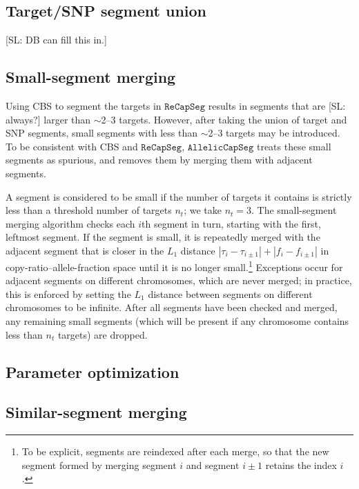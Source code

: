 \documentclass[nofootinbib,amssymb,amsmath]{revtex4}
\newcommand{\RCS}{\texttt{ReCapSeg}}
\newcommand{\ACS}{\texttt{AllelicCapSeg}}
\def\SL#1{{\color [rgb]{0,0,0.8} [SL: #1]}}
\begin{document}
\subsection{Target/SNP segment union} \label{targetsnp-segment-union}

\SL{DB can fill this in.}

\subsection{Small-segment merging} \label{small-segment-merging}

Using CBS to segment the targets in $\RCS$ results in segments that are \SL{always?} larger than $\sim$2--3 targets.  However, after taking the union of target and SNP segments, small segments with less than $\sim$2--3 targets may be introduced.  To be consistent with CBS and $\RCS$, $\ACS$ treats these small segments as spurious, and removes them by merging them with adjacent segments.

A segment is considered to be small if the number of targets it contains is strictly less than a threshold number of targets $n_t$; we take $n_t = 3$.  The small-segment merging algorithm checks each $i$th segment in turn, starting with the first, leftmost segment.  If the segment is small, it is repeatedly merged with the adjacent segment that is closer in the $L_1$ distance $|\tau_i - \tau_{i \pm 1}| + |f_i - f_{i \pm 1}|$ in copy-ratio--allele-fraction space until it is no longer small.\footnote{To be explicit, segments are reindexed after each merge, so that the new segment formed by merging segment $i$ and segment $i \pm 1$ retains the index $i$.}  Exceptions occur for adjacent segments on different chromosomes, which are never merged; in practice, this is enforced by setting the $L_1$ distance between segments on different chromosomes to be infinite.  After all segments have been checked and merged, any remaining small segments (which will be present if any chromosome contains less than $n_t$ targets) are dropped.

\subsection{Parameter optimization}\label{parameter-optimization}

\subsection{Similar-segment merging} \label{similar-segment-merging}
\end{document}
